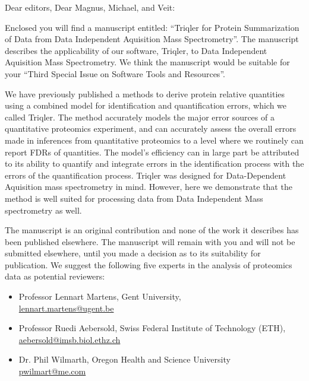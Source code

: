 \documentclass[a4paper]{letter}
\begin{document}
\begin{letter}{}
\vspace*{-5.0cm}

\opening{Dear editors, Dear Magnus, Michael, and Veit:}

Enclosed you will find a manuscript entitled: 
``Triqler for Protein Summarization of Data from Data Independent Aquisition Mass Spectrometry''. 
The manuscript describes the applicability of our software, Triqler, to Data Independent Aquisition Mass Spectrometry. We think the manuscript would be suitable for
your ``Third Special Issue on Software Tools and Resources''. 

We have previously published a methods to derive protein relative quantities 
using a combined model for identification and quantification
errors, which we called Triqler. 
The method accurately models the major error sources of a
quantitative proteomics experiment, and can accurately assess the overall errors
made in inferences from quantitative proteomics to a level where we routinely
can report FDRs of quantities. The model's efficiency can in large part be
attributed to its ability to quantify and integrate errors in the identification
process with the errors of the quantification process.
Triqler was designed for Data-Dependent Aquisition mass spectrometry in mind. 
However, here we demonstrate that the method is well suited for processing data from Data Independent Mass spectrometry as well. 
 
The manuscript is an original contribution and none of the work it
describes has been published elsewhere. The manuscript will
remain with you and will not be submitted elsewhere, until you made a
decision as to its suitability for publication.
We suggest the following five experts in the analysis of proteomics
data as potential reviewers:

\begin{itemize}

\item Professor Lennart Martens,
Gent University, \\
\url{lennart.martens@ugent.be}

\item Professor Ruedi Aebersold, Swiss Federal Institute of Technology
      (ETH), \\
\url{aebersold@imsb.biol.ethz.ch}

\item Dr. Phil Wilmarth, Oregon Health and Science University\\
\url{pwilmart@me.com}


\end{itemize}
\end{letter}
\end{document}
